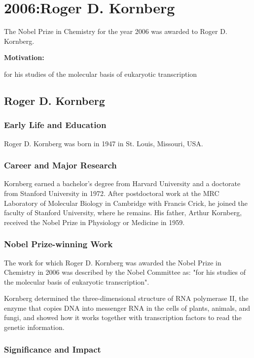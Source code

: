 \chapter{2006:Roger D. Kornberg}

\label{chap:chemistry2006}

The Nobel Prize in Chemistry for the year 2006 was awarded to Roger D. Kornberg.

\textbf{Motivation:}

for his studies of the molecular basis of eukaryotic transcription

\section{Roger D. Kornberg}

\subsection*{Early Life and Education}

Roger D. Kornberg was born in 1947 in St. Louis, Missouri, USA.

\subsection*{Career and Major Research}

Kornberg earned a bachelor's degree from Harvard University and a doctorate from Stanford University in 1972. After postdoctoral work at the MRC Laboratory of Molecular Biology in Cambridge with Francis Crick, he joined the faculty of Stanford University, where he remains. His father, Arthur Kornberg, received the Nobel Prize in Physiology or Medicine in 1959.

\subsection*{Nobel Prize-winning Work}

The work for which Roger D. Kornberg was awarded the Nobel Prize in Chemistry in 2006 was described by the Nobel Committee as: "for his studies of the molecular basis of eukaryotic transcription".

Kornberg determined the three-dimensional structure of RNA polymerase II, the enzyme that copies DNA into messenger RNA in the cells of plants, animals, and fungi, and showed how it works together with transcription factors to read the genetic information.

\subsection*{Significance and Impact}

